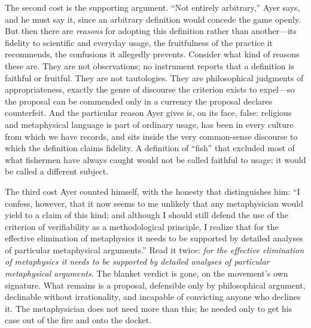 The second cost is the supporting argument. ``Not entirely arbitrary,'' Ayer says, and he must say it, since an arbitrary definition would concede the game openly. But then there are \emph{reasons} for adopting this definition rather than another---its fidelity to scientific and everyday usage, the fruitfulness of the practice it recommends, the confusions it allegedly prevents. Consider what kind of reasons these are. They are not observations; no instrument reports that a definition is faithful or fruitful. They are not tautologies. They are philosophical judgments of appropriateness, exactly the genre of discourse the criterion exists to expel---so the proposal can be commended only in a currency the proposal declares counterfeit. And the particular reason Ayer gives is, on its face, false: religious and metaphysical language is part of ordinary usage, has been in every culture from which we have records, and sits inside the very common-sense discourse to which the definition claims fidelity. A definition of ``fish'' that excluded most of what fishermen have always caught would not be called faithful to usage; it would be called a different subject.

The third cost Ayer counted himself, with the honesty that distinguishes him: ``I confess, however, that it now seems to me unlikely that any metaphysician would yield to a claim of this kind; and although I should still defend the use of the criterion of verifiability as a methodological principle, I realize that for the effective elimination of metaphysics it needs to be supported by detailed analyses of particular metaphysical arguments.'' Read it twice: \emph{for the effective elimination of metaphysics it needs to be supported by detailed analyses of particular metaphysical arguments}. The blanket verdict is gone, on the movement's own signature. What remains is a proposal, defensible only by philosophical argument, declinable without irrationality, and incapable of convicting anyone who declines it. The metaphysician does not need more than this; he needed only to get his case out of the fire and onto the docket.

